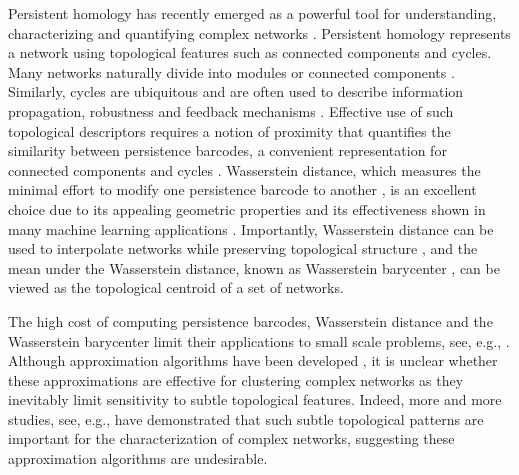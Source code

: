\documentclass{article} %
\begin{document}
Persistent homology \citep{barannikov1994framed,edelsbrunner2000topological} has recently emerged as a powerful tool for understanding, characterizing and quantifying complex networks \citep{songdechakraiwut2021topological}. 
Persistent homology represents a network using topological features such as connected components and cycles. Many networks naturally divide into modules or connected components \citep{bullmore2009complex,honey2007network}. Similarly, cycles are ubiquitous and are  often used to describe information propagation, robustness and feedback mechanisms \citep{kwon2007analysis,lind2005cycles}. 
Effective use of such topological descriptors requires a notion of proximity that quantifies the similarity between persistence barcodes, a convenient representation for connected components and cycles \citep{ghrist2008barcodes}. Wasserstein distance, which measures the minimal effort to modify one persistence barcode to another \citep{rabin2011wasserstein}, is an excellent choice due to its appealing geometric properties \citep{staerman2021ot} and its effectiveness shown in many machine learning applications \citep{kolouri2017optimal,mi2018variational,solomon2015convolutional}. Importantly, Wasserstein distance can be used to interpolate networks while preserving topological structure \citep{songdechakraiwut2021topological}, and the mean under the Wasserstein distance, known as Wasserstein barycenter \citep{agueh2011barycenters}, can be viewed as the topological centroid of a set of networks.

The high cost of computing persistence barcodes, Wasserstein distance and the Wasserstein barycenter limit their applications to small scale problems, see, e.g., \citep{clough2020topological,hu2019topology,kolouri2017optimal,mi2018variational}. Although approximation algorithms have been developed \citep{cuturi2013sinkhorn,cuturi2014fast,Lacombe2018LargeSC,li2020continuous,solomon2015convolutional,vidal2019progressive,xie2020fast,ye2017fast}, it is unclear whether these approximations are effective for clustering complex networks as they inevitably limit sensitivity to subtle topological features. Indeed, more and more studies, see, e.g., \citep{robins2016principal,xia2014persistent} have demonstrated that such subtle topological patterns are important for the characterization of complex networks, suggesting these approximation algorithms are undesirable.
\end{document}
